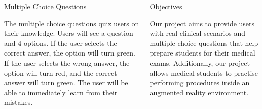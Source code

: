 \documentclass[final]{beamer}
\newlength{\onecolwid}
\begin{document}
\begin{frame}[t]
\begin{columns}[t]
\begin{column}{\onecolwid}
\begin{block}{\LARGE Multiple Choice Questions}
\begin{figure}
\end{figure}
\large
The multiple choice questions quiz users on their knowledge. Users will see a question and 4 options. If the user selects the correct answer, the option will turn green. If the user selects the wrong answer, the option will turn red, and the correct answer will turn green. The user will be able to immediately learn from their mistakes.

\end{block}


\end{column} %

\begin{column}{\onecolwid} %


\begin{alertblock}{\LARGE Objectives}

\large
Our project aims to provide users with real clinical scenarios and multiple choice questions that help prepare students for their medical exams. Additionally, our project allows medical students to practise performing procedures inside an augmented reality environment.

\end{alertblock}



\end{column}
\end{columns}
\end{frame}
\end{document}
